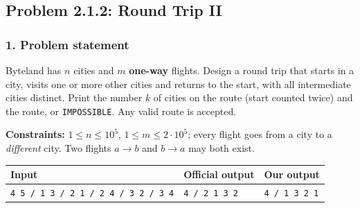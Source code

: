 \subsection{Problem 2.1.2: Round Trip II}


\subsubsection*{1. Problem statement}

Byteland has $n$ cities and $m$ \textbf{one-way} flights. Design a round trip that starts in a city, visits one or more other cities and returns to the start, with all intermediate cities distinct. Print the number $k$ of cities on the route (start counted twice) and the route, or \texttt{IMPOSSIBLE}. Any valid route is accepted.

\textbf{Constraints:} $1 \le n \le 10^5$, $1 \le m \le 2\cdot10^5$; every flight goes from a city to a \emph{different} city. Two flights $a \to b$ and $b \to a$ may both exist.

\begin{table}[H]
\centering\small
\begin{tabular}{@{}lll@{}}
\toprule
\textbf{Input} & \textbf{Official output} & \textbf{Our output} \\
\midrule
\texttt{4 5 / 1 3 / 2 1 / 2 4 / 3 2 / 3 4} & \texttt{4 / 2 1 3 2} & \texttt{4 / 1 3 2 1} \\
\bottomrule
\end{tabular}
\end{table}

